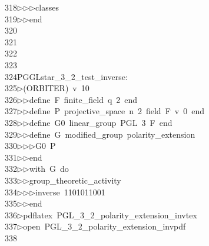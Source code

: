 \begin{tabbing}
318\>$\triangleright$\>$\triangleright$\>$\triangleright$\>classes\ \\[0pt]
319\>$\triangleright$\>$\triangleright$\>end\\[0pt]
320\>\\[0pt]
321\>\\[0pt]
322\>\\[0pt]
323\>\\[0pt]
324\>PGGLstar\_3\_2\_test\_inverse:\\[0pt]
325\>$\triangleright$\>(ORBITER)\ v\ 10\ \\[0pt]
326\>$\triangleright$\>$\triangleright$\>define\ F\ finite\_field\ q\ 2\ end\ \\[0pt]
327\>$\triangleright$\>$\triangleright$\>define\ P\ projective\_space\ n\ 2\ field\ F\ v\ 0\ end\ \\[0pt]
328\>$\triangleright$\>$\triangleright$\>define\ G0\ linear\_group\ PGL\ 3\ F\ end\ \\[0pt]
329\>$\triangleright$\>$\triangleright$\>define\ G\ modified\_group\ polarity\_extension\ \\[0pt]
330\>$\triangleright$\>$\triangleright$\>$\triangleright$\>G0\ P\ \\[0pt]
331\>$\triangleright$\>$\triangleright$\>end\ \\[0pt]
332\>$\triangleright$\>$\triangleright$\>with\ G\ do\ \\[0pt]
333\>$\triangleright$\>$\triangleright$\>group\_theoretic\_activity\ \\[0pt]
334\>$\triangleright$\>$\triangleright$\>$\triangleright$\>inverse\ 1101011001\ \\[0pt]
335\>$\triangleright$\>$\triangleright$\>end\\[0pt]
336\>$\triangleright$\>pdflatex\ PGL\_3\_2\_polarity\_extension\_invtex\\[0pt]
337\>$\triangleright$\>open\ PGL\_3\_2\_polarity\_extension\_invpdf\\[0pt]
338\>\\[0pt]

\end{tabbing}
